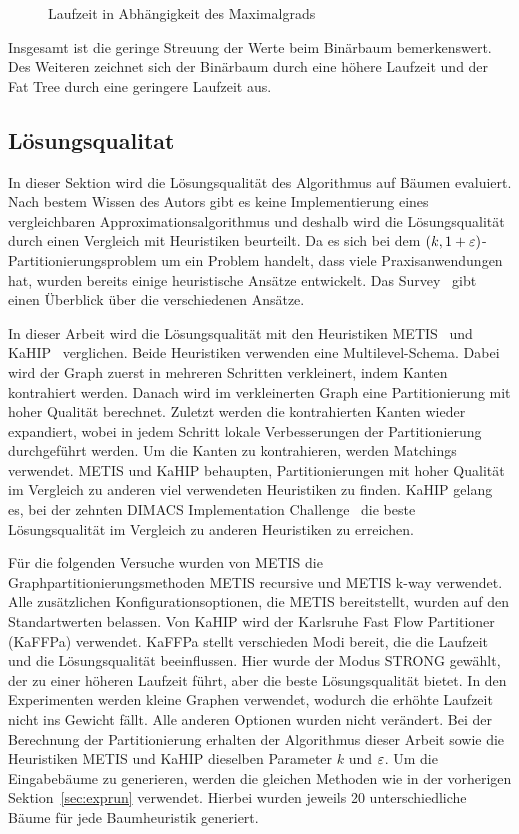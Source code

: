 \begin{figure}[h]
    \centering
    
    \caption{Laufzeit in Abhängigkeit des Maximalgrads\label{fig:rundeg}}
\end{figure}

Insgesamt ist die geringe Streuung der Werte beim Binärbaum bemerkenswert.
Des Weiteren zeichnet sich der Binärbaum durch eine höhere Laufzeit und der Fat Tree durch eine geringere Laufzeit aus.

\subsection{Lösungsqualitat}
In dieser Sektion wird die Lösungsqualität des Algorithmus auf Bäumen evaluiert.
Nach bestem Wissen des Autors gibt es keine Implementierung eines vergleichbaren Approximationsalgorithmus und deshalb wird die Lösungsqualität durch einen Vergleich mit Heuristiken beurteilt.
Da es sich bei dem $(k,1+\varepsilon)$\hyp Partitionierungsproblem um ein Problem handelt, dass viele Praxisanwendungen hat, wurden bereits einige heuristische Ansätze entwickelt. 
Das Survey~\cite{BMS+16} gibt einen Überblick über die verschiedenen Ansätze.

In dieser Arbeit wird die Lösungsqualität mit den Heuristiken METIS~\cite{KK98} und KaHIP~\cite{SS13} verglichen.
Beide Heuristiken verwenden eine Multilevel-Schema.
Dabei wird der Graph zuerst in mehreren Schritten verkleinert, indem Kanten kontrahiert werden.
Danach wird im verkleinerten Graph eine Partitionierung mit hoher Qualität berechnet.
Zuletzt werden die kontrahierten Kanten wieder expandiert, wobei in jedem Schritt lokale Verbesserungen der Partitionierung durchgeführt werden.
Um die Kanten zu kontrahieren, werden Matchings verwendet.
METIS und KaHIP behaupten, Partitionierungen mit hoher Qualität im Vergleich zu anderen viel verwendeten Heuristiken zu finden.
KaHIP gelang es, bei der zehnten DIMACS Implementation Challenge~\cite{BMS+13} die beste Lösungsqualität im Vergleich zu anderen Heuristiken zu erreichen.

Für die folgenden Versuche wurden von METIS die Graphpartitionierungsmethoden METIS recursive und METIS k-way verwendet.
Alle zusätzlichen Konfigurationsoptionen, die METIS bereitstellt, wurden auf den Standartwerten belassen.
Von KaHIP wird der Karlsruhe Fast Flow Partitioner (KaFFPa) verwendet.
KaFFPa stellt verschieden Modi bereit, die die Laufzeit und die Lösungsqualität beeinflussen.
Hier wurde der Modus STRONG gewählt, der zu einer höheren Laufzeit führt, aber die beste Lösungsqualität bietet.
In den Experimenten werden kleine Graphen verwendet, wodurch die erhöhte Laufzeit nicht ins Gewicht fällt.
Alle anderen Optionen wurden nicht verändert.
Bei der Berechnung der Partitionierung erhalten der Algorithmus dieser Arbeit sowie die Heuristiken METIS und KaHIP dieselben Parameter $k$ und $\varepsilon$.
Um die Eingabebäume zu generieren, werden die gleichen Methoden wie in der vorherigen Sektion~\ref{sec:exprun} verwendet.
Hierbei wurden jeweils 20 unterschiedliche Bäume für jede Baumheuristik generiert.

